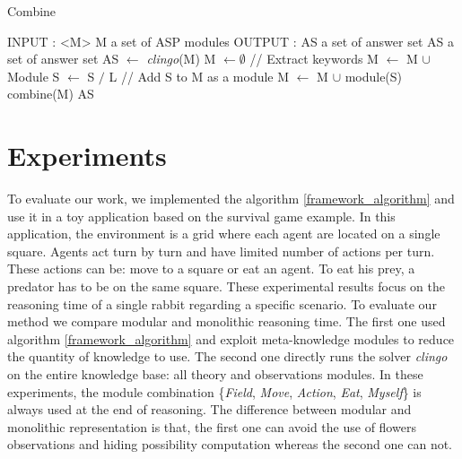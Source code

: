 \documentclass{aamas2012}
\begin{document}
	\begin{algorithm}
	\caption{Combine}
	\label{framework_algorithm}
	\begin{algorithmic}[1]
	\STATE INPUT : <M> M a set of ASP modules
	\STATE OUTPUT : AS a set of answer set
	\newline
	\STATE AS a set of answer set
	\newline
	\STATE AS $\leftarrow$ \emph{clingo}(M)
	\newline
		\STATE M $\leftarrow \emptyset$ 
		\newline
		\STATE // Extract keywords
				\STATE M $\leftarrow$ M $\cup$ Module
				\STATE S $\leftarrow$ S $/$ L
			\ENDIF
		\ENDFOR
		\newline
			\STATE // Add S to M as a module
			\STATE M $\leftarrow$ M $\cup$ module(S)
			\STATE combine(M)
		\ENDIF
	\ENDFOR
	\newline
	\RETURN AS
	\end{algorithmic}
	\end{algorithm}

\section{Experiments}

	To evaluate our work, we implemented the algorithm \ref{framework_algorithm} and use it in a toy application based on the survival game example.
	In this application, the environment is a grid where each agent are located on a single square.
	Agents act turn by turn and have limited number of actions per turn.
	These actions can be: move to a square or eat an agent.
	To eat his prey, a predator has to be on the same square.
	These experimental results focus on the reasoning time of a single rabbit regarding a specific scenario.
	To evaluate our method we compare modular and monolithic reasoning time.
	The first one used algorithm \ref{framework_algorithm} and exploit meta-knowledge modules to reduce the quantity of knowledge to use.
	The second one directly runs the solver \emph{clingo} on the entire knowledge base: all theory and observations modules.
	In these experiments, the module combination \{\emph{Field}, \emph{Move}, \emph{Action}, \emph{Eat}, \emph{Myself}\} is always used at the end of reasoning.
	The difference between modular and monolithic representation is that,
	the first one can avoid the use of flowers observations and hiding possibility computation whereas the second one can not.
	
\end{document}
